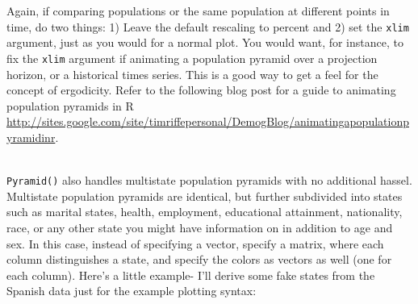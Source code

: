 \documentclass[a4paper]{article}
\begin{document}
Again, if comparing populations or the same population at different points in time, do two things: 1) Leave the default rescaling to percent and 2) set the \texttt{xlim} argument, just as you would for a normal plot. You would want, for instance, to fix the \texttt{xlim} argument if animating a population pyramid over a projection horizon, or a historical times series. This is a good way to get a feel for the concept of ergodicity. Refer to the following blog post for a guide to animating population pyramids in R \url{http://sites.google.com/site/timriffepersonal/DemogBlog/animatingapopulationpyramidinr}.\\\

\texttt{Pyramid()} also handles multistate population pyramids with no additional hassel. Multistate population pyramids are identical, but further subdivided into states such as marital states, health, employment, educational attainment, nationality, race, or any other state you might have information on in addition to age and sex. In this case, instead of specifying a vector, specify a matrix, where each column distinguishes a state, and specify the colors as vectors as well (one for each column). Here's a little example- I'll derive some fake states from the Spanish data just for the example plotting syntax:
\end{document}
